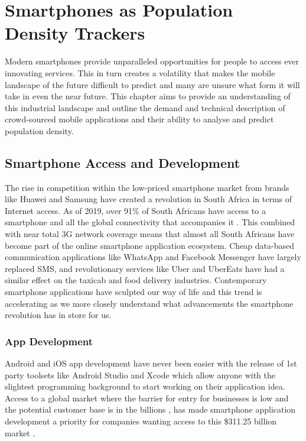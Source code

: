 \chapter{Smartphones as Population Density Trackers}
\label{chap:lit-review}
Modern smartphones provide unparalleled opportunities for people to access ever innovating services. This in turn creates a volatility that makes the mobile landscape of the future difficult to predict and many are unsure what form it will take in even the near future. This chapter aims to provide an understanding of this industrial landscape and outline the demand and technical description of crowd-sourced mobile applications and their ability to analyse and predict population density.

\section{Smartphone Access and Development}

The rise in competition within the low-priced smartphone market from brands like Huawei and Samsung have created a revolution in South Africa in terms of Internet access. As of 2019, over 91\% of South Africans have access to a smartphone and all the global connectivity that accompanies it \cite{ICASA2020}. This combined with near total 3G network coverage \cite{ICASA2020} means that almost all South Africans have become part of the online smartphone application ecosystem. Cheap data-based communication applications like WhatsApp and Facebook Messenger have largely replaced SMS, and revolutionary services like Uber and UberEats have had a similar effect on the taxicab and food delivery industries. Contemporary smartphone applications have sculpted our way of life and this trend is accelerating as we more closely understand what advancements the smartphone revolution has in store for us.

\subsection{App Development}
Android and iOS app development have never been easier with the release of 1st party toolsets like Android Studio and Xcode which allow anyone with the slightest programming background to start working on their application idea. Access to a global market where the barrier for entry for businesses is low and the potential customer base is in the billions \cite{Turner}, has made smartphone application development a priority for companies wanting access to this \$311.25 billion market \cite{AlliedMarketResearch2019}.

